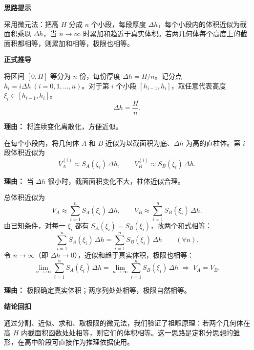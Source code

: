 \begin{proofbox}
	\textbf{\textcolor{CProof}{思路提示}}

	采用微元法：把高 $H$ 分成 $n$ 个小段，每段厚度 $\Delta h$，每个小段内的体积近似为截面积乘以 $\Delta h$，当 $n\to\infty$ 时累加和趋近于真实体积。若两几何体每个高度上的截面积都相等，则累加和相等，极限也相等。

	\medskip
	\textbf{\textcolor{CProof}{正式推导}}
	\begin{description}[style=nextline, leftmargin=2.8em, labelsep=0.5em, itemsep=0.55em]
		\item[\textbf{步骤一（等分高度）：}] 将区间 $[0,H]$ 等分为 $n$ 份，每份厚度 $\Delta h = H/n$。记分点 $h_i = i\Delta h\ (i=0,1,\dots,n)$。对于第 $i$ 个小段 $[h_{i-1}, h_i]$，取任意代表高度 $\xi_i \in [h_{i-1}, h_i]$。
			\[
				\Delta h = \frac{H}{n}.
			\]
			\par\textbf{理由：} 将连续变化离散化，方便近似。

		\item[\textbf{步骤二（近似体积）：}] 在每个小段内，将几何体 $A$ 和 $B$ 近似为以截面积为底、$\Delta h$ 为高的直柱体。第 $i$ 段体积近似为
			\[
				V_{A}^{(i)} \approx S_A(\xi_i)\,\Delta h,
				\qquad
				V_{B}^{(i)} \approx S_B(\xi_i)\,\Delta h.
			\]
			\par\textbf{理由：} 当 $\Delta h$ 很小时，截面面积变化不大，柱体近似合理。

		\item[\textbf{步骤三（求和取极限）：}] 总体积近似为
			\[
				V_A \approx \sum_{i=1}^{n} S_A(\xi_i)\,\Delta h,
				\qquad
				V_B \approx \sum_{i=1}^{n} S_B(\xi_i)\,\Delta h.
			\]
			由已知条件，对每一 $\xi_i$ 都有 $S_A(\xi_i)=S_B(\xi_i)$，故两个和式相等：
			\[
				\sum_{i=1}^{n} S_A(\xi_i)\,\Delta h = \sum_{i=1}^{n} S_B(\xi_i)\,\Delta h
				\qquad
				(\forall n).
			\]
			令 $n\to\infty$（即 $\Delta h\to 0$），近似和趋于真实体积，极限也相等：
			\[
				\lim_{n\to\infty}\sum_{i=1}^{n} S_A(\xi_i)\,\Delta h
				= \lim_{n\to\infty}\sum_{i=1}^{n} S_B(\xi_i)\,\Delta h
				\;\Longrightarrow\; V_A = V_B.
			\]
			\par\textbf{理由：} 极限确定真实体积；两序列处处相等，极限自然相等。
	\end{description}

	\medskip
	\textbf{\textcolor{CProof}{结论回扣}}

	通过分割、近似、求和、取极限的微元法，我们验证了祖暅原理：若两个几何体在高 $H$ 内截面积函数处处相等，则它们的体积相等。这一思路是定积分思想的雏形，在高中阶段可直接作为推理依据使用。
\end{proofbox}
